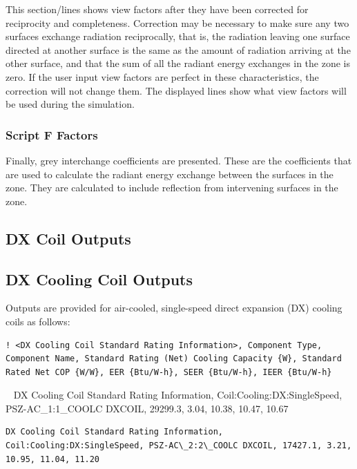 This section/lines shows view factors after they have been corrected for reciprocity and completeness. Correction may be necessary to make sure any two surfaces exchange radiation reciprocally, that is, the radiation leaving one surface directed at another surface is the same as the amount of radiation arriving at the other surface, and that the sum of all the radiant energy exchanges in the zone is zero. If the user input view factors are perfect in these characteristics, the correction will not change them. The displayed lines show what view factors will be used during the simulation.

\subsubsection{Script F Factors}\label{script-f-factors}

Finally, grey interchange coefficients are presented. These are the coefficients that are used to calculate the radiant energy exchange between the surfaces in the zone. They are calculated to include reflection from intervening surfaces in the zone.

\subsection{DX Coil Outputs}\label{dx-coil-outputs}

\subsection{DX Cooling Coil Outputs}\label{dx-cooling-coil-outputs}

Outputs are provided for air-cooled, single-speed direct expansion (DX) cooling coils as follows:

\begin{lstlisting}
! <DX Cooling Coil Standard Rating Information>, Component Type, Component Name, Standard Rating (Net) Cooling Capacity {W}, Standard Rated Net COP {W/W}, EER {Btu/W-h}, SEER {Btu/W-h}, IEER {Btu/W-h}
\end{lstlisting}

~ DX Cooling Coil Standard Rating Information, Coil:Cooling:DX:SingleSpeed, PSZ-AC\_1:1\_COOLC DXCOIL, 29299.3, 3.04, 10.38, 10.47, 10.67

\begin{lstlisting}
DX Cooling Coil Standard Rating Information, Coil:Cooling:DX:SingleSpeed, PSZ-AC\_2:2\_COOLC DXCOIL, 17427.1, 3.21, 10.95, 11.04, 11.20
\end{lstlisting}

